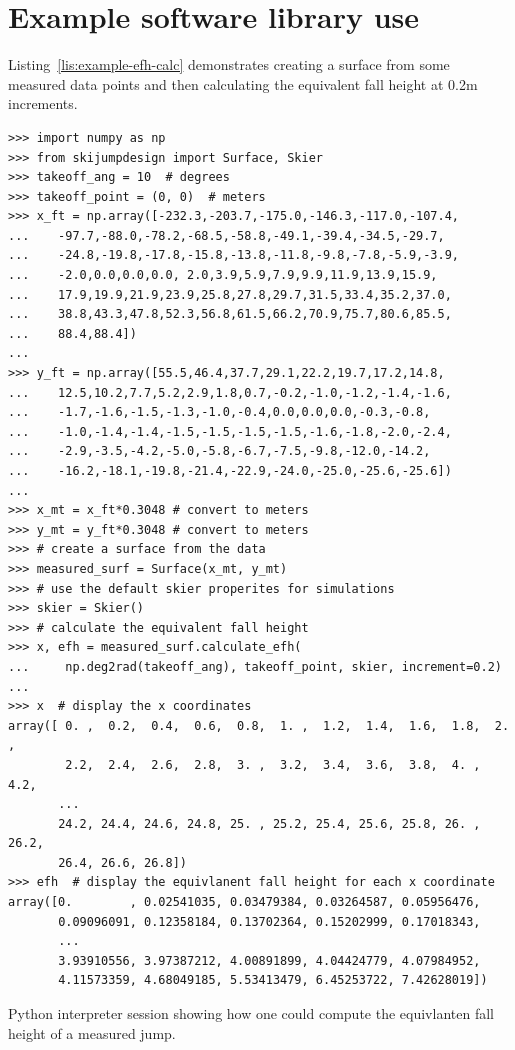 \documentclass{article}
\begin{document}
\section{Example software library use}
%
Listing~\ref{lis:example-efh-calc} demonstrates creating a surface from some
measured data points and then calculating the equivalent fall height at
0.2\si{\meter} increments.
%
\begin{listing*}
  \begin{verbatim}
>>> import numpy as np
>>> from skijumpdesign import Surface, Skier
>>> takeoff_ang = 10  # degrees
>>> takeoff_point = (0, 0)  # meters
>>> x_ft = np.array([-232.3,-203.7,-175.0,-146.3,-117.0,-107.4,
...    -97.7,-88.0,-78.2,-68.5,-58.8,-49.1,-39.4,-34.5,-29.7,
...    -24.8,-19.8,-17.8,-15.8,-13.8,-11.8,-9.8,-7.8,-5.9,-3.9,
...    -2.0,0.0,0.0,0.0, 2.0,3.9,5.9,7.9,9.9,11.9,13.9,15.9,
...    17.9,19.9,21.9,23.9,25.8,27.8,29.7,31.5,33.4,35.2,37.0,
...    38.8,43.3,47.8,52.3,56.8,61.5,66.2,70.9,75.7,80.6,85.5,
...    88.4,88.4])
...
>>> y_ft = np.array([55.5,46.4,37.7,29.1,22.2,19.7,17.2,14.8,
...    12.5,10.2,7.7,5.2,2.9,1.8,0.7,-0.2,-1.0,-1.2,-1.4,-1.6,
...    -1.7,-1.6,-1.5,-1.3,-1.0,-0.4,0.0,0.0,0.0,-0.3,-0.8,
...    -1.0,-1.4,-1.4,-1.5,-1.5,-1.5,-1.5,-1.6,-1.8,-2.0,-2.4,
...    -2.9,-3.5,-4.2,-5.0,-5.8,-6.7,-7.5,-9.8,-12.0,-14.2,
...    -16.2,-18.1,-19.8,-21.4,-22.9,-24.0,-25.0,-25.6,-25.6])
...
>>> x_mt = x_ft*0.3048 # convert to meters
>>> y_mt = y_ft*0.3048 # convert to meters
>>> # create a surface from the data
>>> measured_surf = Surface(x_mt, y_mt)
>>> # use the default skier properites for simulations
>>> skier = Skier()
>>> # calculate the equivalent fall height
>>> x, efh = measured_surf.calculate_efh(
...     np.deg2rad(takeoff_ang), takeoff_point, skier, increment=0.2)
...
>>> x  # display the x coordinates
array([ 0. ,  0.2,  0.4,  0.6,  0.8,  1. ,  1.2,  1.4,  1.6,  1.8,  2. ,
        2.2,  2.4,  2.6,  2.8,  3. ,  3.2,  3.4,  3.6,  3.8,  4. ,  4.2,
       ...
       24.2, 24.4, 24.6, 24.8, 25. , 25.2, 25.4, 25.6, 25.8, 26. , 26.2,
       26.4, 26.6, 26.8])
>>> efh  # display the equivlanent fall height for each x coordinate
array([0.        , 0.02541035, 0.03479384, 0.03264587, 0.05956476,
       0.09096091, 0.12358184, 0.13702364, 0.15202999, 0.17018343,
       ...
       3.93910556, 3.97387212, 4.00891899, 4.04424779, 4.07984952,
       4.11573359, 4.68049185, 5.53413479, 6.45253722, 7.42628019])
  \end{verbatim}
  \caption{Python interpreter session showing how one could compute the
  equivlanten fall height of a measured jump.}
  \label{lis:example-efh-calc}
\end{listing*}
\end{document}
